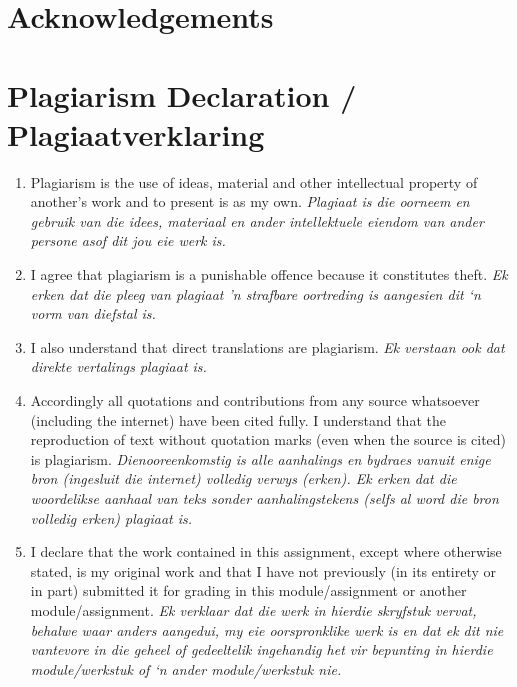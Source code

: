 \documentclass[12pt,a4paper]{report}
\begin{document}
\section*{Acknowledgements}

\newpage

\section*{Plagiarism Declaration / Plagiaatverklaring}
\begin{enumerate}
\item Plagiarism is the use of ideas, material and other intellectual property of another's work and to present is as my own. \newline \textit{Plagiaat is die oorneem en gebruik van die idees, materiaal en ander intellektuele eiendom van ander persone asof dit jou eie werk is.} 
\item I agree that plagiarism is a punishable offence because it constitutes theft. \newline \textit{Ek erken dat die pleeg van plagiaat 'n strafbare oortreding is aangesien dit ‘n vorm van diefstal is. }
\item I also understand that direct translations are plagiarism. \newline \textit{Ek verstaan ook dat direkte vertalings plagiaat is. }
\item Accordingly all quotations and contributions from any source whatsoever (including the internet) have been cited fully. I understand that the reproduction of text without quotation marks (even when the source is cited) is plagiarism. \newline \textit{Dienooreenkomstig is alle aanhalings en bydraes vanuit enige bron (ingesluit die internet) volledig verwys (erken). Ek erken dat die woordelikse aanhaal van teks sonder aanhalingstekens (selfs al word die bron volledig erken) plagiaat is. }
\item I declare that the work contained in this assignment, except where otherwise stated, is my original work and that I have not previously (in its entirety or in part) submitted it for grading in this module/assignment or another module/assignment. \newline \textit{Ek verklaar dat die werk in hierdie skryfstuk vervat, behalwe waar anders aangedui, my eie oorspronklike werk is en dat ek dit nie vantevore in die geheel of gedeeltelik ingehandig het vir bepunting in hierdie module/werkstuk of ‘n ander module/werkstuk nie.} 
\end{enumerate}
\end{document}

